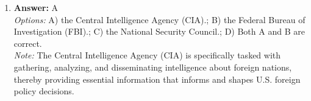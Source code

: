 \documentclass[12pt]{article}
\begin{document}
\begin{enumerate}[label=\arabic*.]
\\ \textit{Note:} Critical questioning represents a move away from traditional interpretations of security studies by challenging established norms and assumptions, thereby broadening the understanding of security beyond state-centric and military-focused perspectives.
\item \textbf{Answer:} A
\\ \textit{Options:} A) the Central Intelligence Agency (CIA).; B) the Federal Bureau of Investigation (FBI).; C) the National Security Council.; D) Both A and B are correct.
\\ \textit{Note:} The Central Intelligence Agency (CIA) is specifically tasked with gathering, analyzing, and disseminating intelligence about foreign nations, thereby providing essential information that informs and shapes U.S. foreign policy decisions.
\end{enumerate}
\end{document}

